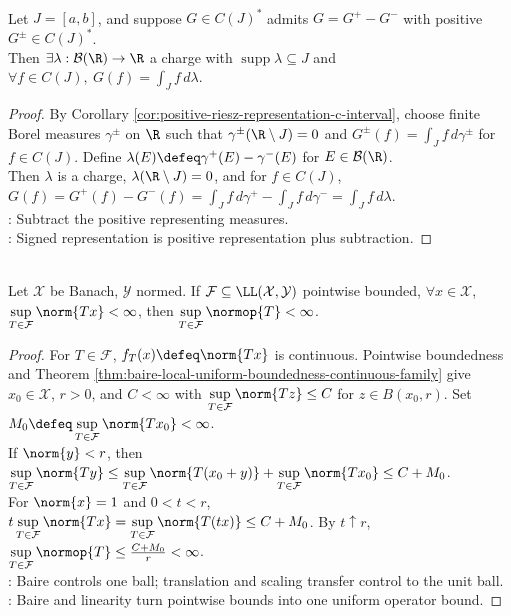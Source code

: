 \begin{corollary} \label{cor:riesz-representation-by-charges-conditional} \\
Let $J=[a,b]$, and suppose $G\in C(J)^*$ admits $G=G^+-G^-$ with positive $G^\pm\in C(J)^*$.\\
Then $\exists\lambda:\mathcal{B}(\R)\to\R$ a charge with $\operatorname{supp}\lambda\subseteq J$ and $\forall f\in C(J),\ G(f)=\int_J f\,d\lambda$.
\begin{proof} By Corollary \ref{cor:positive-riesz-representation-c-interval}, choose finite Borel measures $\gamma^\pm$ on $\R$ such that $\gamma^\pm(\R\setminus J)=0$ and $G^\pm(f)=\int_J f\,d\gamma^\pm$ for $f\in C(J)$. Define $\lambda(E)\defeq\gamma^+(E)-\gamma^-(E)$ for $E\in\mathcal B(\R)$.\\
Then $\lambda$ is a charge, $\lambda(\R\setminus J)=0$, and for $f\in C(J)$, $G(f)=G^+(f)-G^-(f)=\int_J f\,d\gamma^+-\int_J f\,d\gamma^-=\int_J f\,d\lambda$.\\
: Subtract the positive representing measures.\\
: Signed representation is positive representation plus subtraction.
\end{proof}
\end{corollary}

\begin{theorem} \label{thm:uniform-boundedness-principle} \\
Let $\mathcal{X}$ be Banach, $\mathcal{Y}$ normed. If $\mathcal{F}\subseteq\LL(\mathcal{X},\mathcal{Y})$ pointwise bounded, $\forall x\in\mathcal{X}$, $\sup\limits_{T\in\mathcal{F}}\norm{Tx}<\infty$, then $\sup\limits_{T\in\mathcal{F}}\normop{T}<\infty$.
\begin{proof}
For $T\in\mathcal F$, $f_T(x)\defeq\norm{Tx}$ is continuous. Pointwise boundedness and Theorem \ref{thm:baire-local-uniform-boundedness-continuous-family} give $x_0\in\mathcal X$, $r>0$, and $C<\infty$ with $\sup\limits_{T\in\mathcal F}\norm{Tz}\leq C$ for $z\in B(x_0,r)$. Set $M_0\defeq\sup\limits_{T\in\mathcal F}\norm{Tx_0}<\infty$.\\
If $\norm{y}<r$, then $\sup\limits_{T\in\mathcal F}\norm{Ty}\leq\sup\limits_{T\in\mathcal F}\norm{T(x_0+y)}+\sup\limits_{T\in\mathcal F}\norm{Tx_0}\leq C+M_0$.\\
For $\norm{x}=1$ and $0<t<r$, $t\sup\limits_{T\in\mathcal F}\norm{Tx}=\sup\limits_{T\in\mathcal F}\norm{T(tx)}\leq C+M_0$. By $t\uparrow r$, $\sup\limits_{T\in\mathcal F}\normop{T}\leq\frac{C+M_0}{r}<\infty$.\\
: Baire controls one ball; translation and scaling transfer control to the unit ball.\\
: Baire and linearity turn pointwise bounds into one uniform operator bound.
\end{proof}
\end{theorem}

